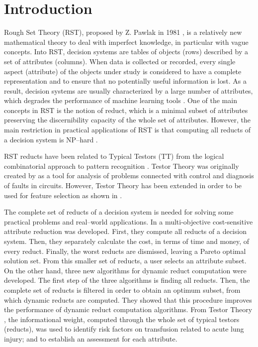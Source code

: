 \documentclass[authoryear,preprint,review,12pt]{elsarticle}
\begin{document}

\section{Introduction}
\label{sect:1}

Rough Set Theory (RST), proposed by Z. Pawlak in 1981 \citep{Pawlak81}, 
is a relatively new mathematical theory to deal with imperfect knowledge, in particular with vague 
concepts. Into RST, decision systems are tables of objects (rows) described by a set of attributes (columns). 
When data is collected or recorded, every single aspect (attribute) of the objects under study is
considered to have a complete representation and to ensure that no potentially useful information is lost. As a result, decision systems are usually characterized by a large number of attributes, which degrades the performance of machine learning tools \citep{Parthalain08}. One of the main concepts in RST is the notion of reduct, which is a minimal subset of attributes preserving the discernibility capacity of the whole set of attributes. However, the main restriction in practical applications of RST is that computing all reducts of a decision system is NP--hard \citep{R40}. 

RST reducts have been related to Typical Testors (TT) from the logical combinatorial approach to pattern recognition \citep{Lazo15}. Testor Theory was originally created by \cite{Cheguis55} as a tool for analysis of problems connected with control and diagnosis of faults in circuits.  However, Testor Theory has been extended in order to be used for feature selection as shown in \citep{R12,R5,R27}.

The complete set of reducts of a decision system is needed for solving some practical problems and real--world applications. In \cite{Xu2013} a multi-objective cost-sensitive attribute reduction was developed. First, they compute all reducts of a decision system. Then, they separately calculate the cost, in terms of time and money, of every reduct. Finally, the worst reducts are dismissed, leaving a Pareto optimal solution set. From this smaller set of reducts, a user selects an attribute subset. On the other hand, \cite{Mukamakuza2014} three new algorithms for dynamic reduct computation were developed. The first step of the three algorithms is finding all reducts. Then, the complete set of reducts is filtered in order to obtain an optimum subset, from which dynamic reducts are computed. They showed that this procedure improves the performance of dynamic reduct computation algorithms. From Testor Theory \cite{Torres2014}, the informational weight, computed through the whole set of typical testors (reducts), was used to identify risk factors on transfusion related to acute lung injury; and to establish an assessment for each attribute.  
\end{document}
